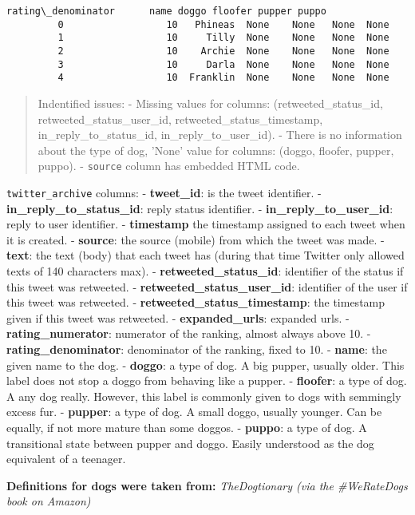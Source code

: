 \documentclass[11pt]{article}
\begin{document}
\begin{Verbatim}[commandchars=\\\{\}]
            rating\_denominator      name doggo floofer pupper puppo  
         0                  10   Phineas  None    None   None  None  
         1                  10     Tilly  None    None   None  None  
         2                  10    Archie  None    None   None  None  
         3                  10     Darla  None    None   None  None  
         4                  10  Franklin  None    None   None  None  
\end{Verbatim}
            
    \begin{quote}
Indentified issues: - Missing values for columns:
(retweeted\_status\_id, retweeted\_status\_user\_id,
retweeted\_status\_timestamp, in\_reply\_to\_status\_id,
in\_reply\_to\_user\_id). - There is no information about the type of
dog, 'None' value for columns: (doggo, floofer, pupper, puppo). -
\texttt{source} column has embedded HTML code.
\end{quote}

    \texttt{twitter\_archive} columns: - \textbf{tweet\_id}: is the tweet
identifier. - \textbf{in\_reply\_to\_status\_id}: reply status
identifier. - \textbf{in\_reply\_to\_user\_id}: reply to user
identifier. - \textbf{timestamp} the timestamp assigned to each tweet
when it is created. - \textbf{source}: the source (mobile) from which
the tweet was made. - \textbf{text}: the text (body) that each tweet has
(during that time Twitter only allowed texts of 140 characters max). -
\textbf{retweeted\_status\_id}: identifier of the status if this tweet
was retweeted. - \textbf{retweeted\_status\_user\_id}: identifier of the
user if this tweet was retweeted. -
\textbf{retweeted\_status\_timestamp}: the timestamp given if this tweet
was retweeted. - \textbf{expanded\_urls}: expanded urls. -
\textbf{rating\_numerator}: numerator of the ranking, almost always
above 10. - \textbf{rating\_denominator}: denominator of the ranking,
fixed to 10. - \textbf{name}: the given name to the dog. -
\textbf{doggo}: a type of dog. A big pupper, usually older. This label
does not stop a doggo from behaving like a pupper. - \textbf{floofer}: a
type of dog. A any dog really. However, this label is commonly given to
dogs with semmingly excess fur. - \textbf{pupper}: a type of dog. A
small doggo, usually younger. Can be equally, if not more mature than
some doggos. - \textbf{puppo}: a type of dog. A transitional state
between pupper and doggo. Easily understood as the dog equivalent of a
teenager.

\textbf{Definitions for dogs were taken from:} \emph{TheDogtionary (via
the \#WeRateDogs book on Amazon)}
\end{document}
